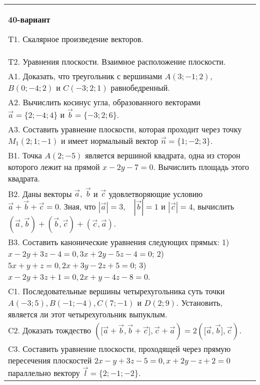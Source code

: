 \documentclass{article}
\begin{document}
\begin{tabular}{m{17cm}}
\textbf{40-вариант}
\newline

T1. 
Скалярное произведение векторов.
 \\
T2. 
Уравнения плоскости. Взаимное расположение плоскости.
 \\
A1. 
Доказать, что треугольник с вершинами \(A(3; - 1;2)\), \(B(0; - 4;2)\) и \(C( - 3;2;1)\) равнобедренный.
 \\
A2. 
Вычислить косинус угла, образованного векторами \(\overrightarrow{a} = \{ 2; - 4;4\}\) и \(\overrightarrow{b} = \{ - 3;2;6\}\).
 \\
A3. Составить уравнение плоскости, которая проходит через точку \(M_{1}(2;1; - 1)\) и имеет нормальный вектор \(\overrightarrow{n} = \{ 1; - 2;3\}\).
 \\
B1. 
Точка \(A(2; - 5)\) является вершиной квадрата, одна из сторон которого лежит на прямой \(x - 2y - 7 = 0\). Вычислить площадь этого квадрата.
 \\
B2. 
Даны векторы \(\overrightarrow{a},\ \overrightarrow{b}\) и \(\overrightarrow{c}\) удовлетворяющие условию \(\overrightarrow{a} + \overrightarrow{b} + \overrightarrow{c} = 0\). Зная, что \(|\overrightarrow{a}| = 3,\ \ \ \ |\overrightarrow{b}| = 1\) и \(|\overrightarrow{c}| = 4\), вычислить \(\left( \overrightarrow{a},\overrightarrow{b} \right) + \left( \overrightarrow{b},\overrightarrow{c} \right) + \left( \overrightarrow{c},\overrightarrow{a} \right)\).
 \\
B3. 
Составить канонические уравнения следующих прямых: 1) \(x - 2y + 3z - 4 = 0,3x + 2y - 5z - 4 = 0\); 2) \(5x + y + z = 0,2x + 3y - 2z + 5 = 0\); 3) \(x - 2y + 3z + 1 = 0,2x + y - 4z - 8 = 0\).
 \\
C1. 
Последовательные вершины четырехугольника суть точки \(A( - 3;5),B( - 1; - 4),C(7; - 1)\) и \(D(2;9)\). Установить, является ли этот четырехугольник выпуклым.
 \\
C2. 
Доказать тождество \((\lbrack\overrightarrow{a} + \overrightarrow{b},\overrightarrow{b} + \overrightarrow{c}\rbrack,\overrightarrow{c} + \overrightarrow{a}) = 2(\lbrack\overrightarrow{a},\overrightarrow{b}\rbrack,\overrightarrow{c})\).
 \\
C3. Составить уравнение плоскости, проходящей через прямую пересечения плоскостей \(2x - y + 3z - 5 = 0,x + 2y - z + 2 = 0\) параллельно вектору \(\overrightarrow{l} = \{ 2; - 1; - 2\}\).
 \\

\end{tabular}
\vspace{1cm}
\end{document}
